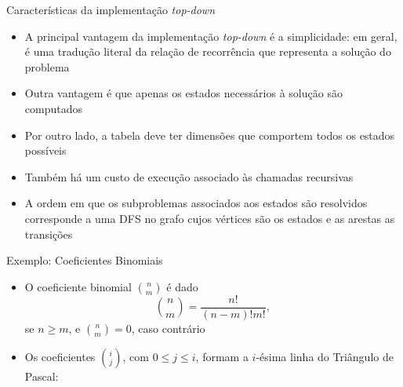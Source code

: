 \begin{frame}[fragile]{Características da implementação {\it top-down}}

    \begin{itemize}
        \item A principal vantagem da implementação \textit{top-down} é a simplicidade: em geral,
            é uma tradução literal da relação de recorrência que representa a solução do problema

        \item Outra vantagem é que apenas os estados necessários à solução são computados

        \item Por outro lado, a tabela deve ter dimensões que comportem todos os estados possíveis

        \item Também há um custo de execução associado às chamadas recursivas 

        \item A ordem em que os subproblemas associados aos estados são resolvidos corresponde
            a uma DFS no grafo cujos vértices são os estados e as arestas as transições
    \end{itemize}

\end{frame}

\begin{frame}[fragile]{Exemplo: Coeficientes Binomiais}

    \begin{itemize}

        \item O coeficiente binomial $\binom{n}{m}$ é dado
        \[
            \binom{n}{m} = \frac{n!}{(n - m)!m!},
        \]
        se $n \geq m$, e $\binom{n}{m} = 0$, caso contrário

        \item Os coeficientes $\binom{i}{j}$, com $0\leq j\leq i$, formam a $i$-ésima linha do
            Triângulo de Pascal:

            

    \end{itemize}
 
\end{frame}

